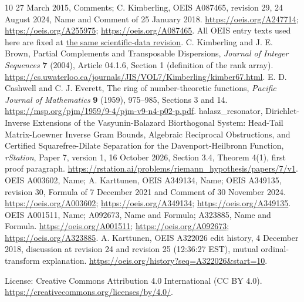 \documentclass[11pt]{article}
\begin{document}
\begin{thebibliography}{10}
27 March 2015, Comments; C. Kimberling, OEIS A087465, revision 29,
24 August 2024, Name and Comment of 25 January 2018.
\url{https://oeis.org/A247714}; \url{https://oeis.org/A255975};
\url{https://oeis.org/A087465}.
All OEIS entry texts used here are fixed at
\href{https://github.com/oeis/oeisdata/tree/f151d82acb28766e6034a902ed9fd0632b16f986/seq}{the same scientific-data revision}.
 C. Kimberling and J. E. Brown,
Partial Complements and Transposable Dispersions,
\emph{Journal of Integer Sequences} \textbf{7} (2004), Article 04.1.6,
Section 1 (definition of the rank array).
\url{https://cs.uwaterloo.ca/journals/JIS/VOL7/Kimberling/kimber67.html}.
 E. D. Cashwell and C. J. Everett,
The ring of number-theoretic functions,
\emph{Pacific Journal of Mathematics} \textbf{9} (1959), 975--985,
Sections 3 and 14.
\url{https://msp.org/pjm/1959/9-4/pjm-v9-n4-p02-p.pdf}.
 halasz\_resonator,
Dirichlet-Inverse Extensions of the Vasyunin-Balazard Biorthogonal System:
Head-Tail Matrix-Loewner Inverse Gram Bounds, Algebraic Reciprocal Obstructions,
and Certified Squarefree-Dilate Separation for the Davenport-Heilbronn Function,
\emph{rStation}, Paper 7, version 1, 16 October 2026,
Section 3.4, Theorem 4(1), first proof paragraph.
\url{https://rstation.ai/problems/riemann_hypothesis/papers/7/v1}.
 OEIS A003602, Name; A. Karttunen, OEIS A349134, Name;
OEIS A349135, revision 30, Formula of 7 December 2021 and
Comment of 30 November 2024.
\url{https://oeis.org/A003602}; \url{https://oeis.org/A349134};
\url{https://oeis.org/A349135}.
 OEIS A001511, Name; A092673, Name and Formula;
A323885, Name and Formula.
\url{https://oeis.org/A001511}; \url{https://oeis.org/A092673};
\url{https://oeis.org/A323885}.
 A. Karttunen, OEIS A322026 edit history,
4 December 2018, discussion at revision 24 and revision 25
(12:36:27 EST), mutual ordinal-transform explanation.
\url{https://oeis.org/history?seq=A322026&start=10}.
\end{thebibliography}
\noindent\small License: Creative Commons Attribution 4.0 International
(CC BY 4.0). \url{https://creativecommons.org/licenses/by/4.0/}.
\end{document}
